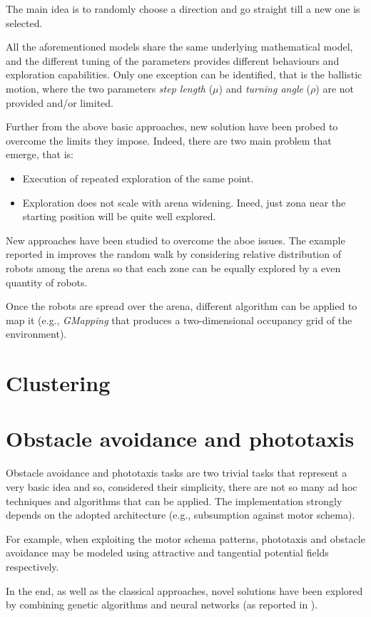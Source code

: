 The main idea is to randomly choose a direction and go straight till a new one is selected.

\noindent
All the aforementioned models share the same underlying mathematical model, and the different tuning of the parameters provides different behaviours and exploration capabilities. Only one exception can be identified, that is the ballistic motion, where the two parameters \textit{step length} ($\mu$) and \textit{turning angle} ($\rho$) are not provided and/or limited. 

\bigskip
Further from the above basic approaches, new solution have been probed to overcome the limits they impose. Indeed, there are two main problem that emerge, that is:

\begin{itemize}

  \item Execution of repeated exploration of the same point.
  \item Exploration does not scale with arena widening. Ineed, just zona near the starting position will be quite well explored.
 
\end{itemize}

New approaches have been studied to overcome the aboe issues. The example reported in \cite{rw-improved} improves the random walk by considering relative distribution of robots among the arena so that each zone can be equally explored by a even quantity of robots.  

\bigskip
Once the robots are spread over the arena, different algorithm can be applied to map it (e.g., \textit{GMapping} that produces a two-dimensional occupancy grid of the environment). 

\section{Clustering}



\section{Obstacle avoidance and phototaxis}

Obstacle avoidance and phototaxis tasks are two trivial tasks that represent a very basic idea and so, considered their simplicity, there are not so many ad hoc techniques and algorithms that can be applied. The implementation strongly depends on the adopted architecture (e.g., subsumption against motor schema). 

\noindent
For example, when exploiting the motor schema patterns, phototaxis and obstacle avoidance may be modeled using attractive and tangential potential fields respectively. 

\noindent
In the end, as well as the classical approaches, novel solutions have been explored by combining genetic algorithms and neural networks (as reported in \cite{obstacle-NN}).



